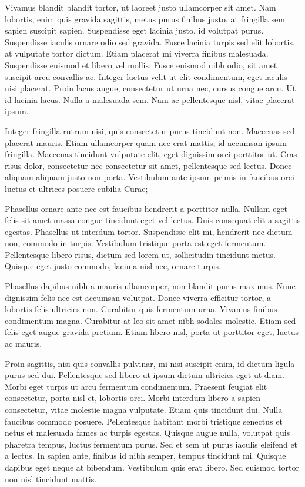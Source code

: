 \documentclass{amsbook}
\begin{document}
Vivamus blandit blandit tortor, ut laoreet justo ullamcorper sit amet. Nam lobortis, enim quis gravida sagittis, metus purus finibus justo, at fringilla sem sapien suscipit sapien. Suspendisse eget lacinia justo, id volutpat purus. Suspendisse iaculis ornare odio sed gravida. Fusce lacinia turpis sed elit lobortis, at vulputate tortor dictum. Etiam placerat mi viverra finibus malesuada. Suspendisse euismod et libero vel mollis. Fusce euismod nibh odio, sit amet suscipit arcu convallis ac. Integer luctus velit ut elit condimentum, eget iaculis nisi placerat. Proin lacus augue, consectetur ut urna nec, cursus congue arcu. Ut id lacinia lacus. Nulla a malesuada sem. Nam ac pellentesque nisl, vitae placerat ipsum.

Integer fringilla rutrum nisi, quis consectetur purus tincidunt non. Maecenas sed placerat mauris. Etiam ullamcorper quam nec erat mattis, id accumsan ipsum fringilla. Maecenas tincidunt vulputate elit, eget dignissim orci porttitor ut. Cras risus dolor, consectetur nec consectetur sit amet, pellentesque sed lectus. Donec aliquam aliquam justo non porta. Vestibulum ante ipsum primis in faucibus orci luctus et ultrices posuere cubilia Curae;

Phasellus ornare ante nec est faucibus hendrerit a porttitor nulla. Nullam eget felis sit amet massa congue tincidunt eget vel lectus. Duis consequat elit a sagittis egestas. Phasellus ut interdum tortor. Suspendisse elit mi, hendrerit nec dictum non, commodo in turpis. Vestibulum tristique porta est eget fermentum. Pellentesque libero risus, dictum sed lorem ut, sollicitudin tincidunt metus. Quisque eget justo commodo, lacinia nisl nec, ornare turpis.

Phasellus dapibus nibh a mauris ullamcorper, non blandit purus maximus. Nunc dignissim felis nec est accumsan volutpat. Donec viverra efficitur tortor, a lobortis felis ultricies non. Curabitur quis fermentum urna. Vivamus finibus condimentum magna. Curabitur at leo sit amet nibh sodales molestie. Etiam sed felis eget augue gravida pretium. Etiam libero nisl, porta ut porttitor eget, luctus ac mauris.

Proin sagittis, nisi quis convallis pulvinar, mi nisi suscipit enim, id dictum ligula purus sed dui. Pellentesque sed libero ut ipsum dictum ultricies eget ut diam. Morbi eget turpis ut arcu fermentum condimentum. Praesent feugiat elit consectetur, porta nisl et, lobortis orci. Morbi interdum libero a sapien consectetur, vitae molestie magna vulputate. Etiam quis tincidunt dui. Nulla faucibus commodo posuere. Pellentesque habitant morbi tristique senectus et netus et malesuada fames ac turpis egestas. Quisque augue nulla, volutpat quis pharetra tempus, luctus fermentum purus. Sed et sem ut purus iaculis eleifend et a lectus. In sapien ante, finibus id nibh semper, tempus tincidunt mi. Quisque dapibus eget neque at bibendum. Vestibulum quis erat libero. Sed euismod tortor non nisl tincidunt mattis.
\end{document}

